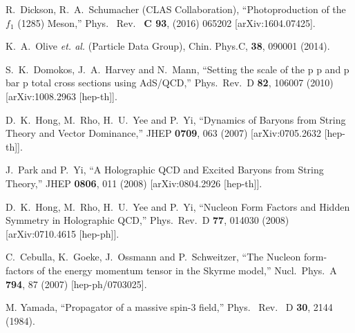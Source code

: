 \documentclass[aps, prd, preprintnumbers, floatfix, showpacs, showkeys, nofootinbib, 10pt]{revtex4-1}
\begin{document}
\begin{references}

R.~Dickson, R.~A.~Schumacher (CLAS Collaboration), 
``Photoproduction of the $f_1$ (1285) Meson,''
Phys. \ Rev. \ {\bf C 93}, (2016) 065202
[arXiv:1604.07425].

K.~A.~Olive \emph{et. al.}  (Particle Data Group), Chin. Phys.C, {\bf 38}, 090001 (2014).



  S.~K.~Domokos, J.~A.~Harvey and N.~Mann,
  ``Setting the scale of the p p and p bar p total cross sections using AdS/QCD,''
  Phys.\ Rev.\ D {\bf 82}, 106007 (2010)
  [arXiv:1008.2963 [hep-th]].

  D.~K.~Hong, M.~Rho, H.~U.~Yee and P.~Yi,
  ``Dynamics of Baryons from String Theory and Vector Dominance,''
  JHEP {\bf 0709}, 063 (2007)
  [arXiv:0705.2632 [hep-th]].

  J.~Park and P.~Yi,
  ``A Holographic QCD and Excited Baryons from String Theory,''
  JHEP {\bf 0806}, 011 (2008)
  [arXiv:0804.2926 [hep-th]].


  D.~K.~Hong, M.~Rho, H.~U.~Yee and P.~Yi,
  ``Nucleon Form Factors and Hidden Symmetry in Holographic QCD,''
  Phys.\ Rev.\  D {\bf 77}, 014030 (2008)
  [arXiv:0710.4615 [hep-ph]].

  C.~Cebulla, K.~Goeke, J.~Ossmann and P.~Schweitzer,
  ``The Nucleon form-factors of the energy momentum tensor in the Skyrme model,''
  Nucl.\ Phys.\ A {\bf 794}, 87 (2007)
  [hep-ph/0703025].


M. Yamada,
``Propagator of a massive spin-3 field,''
Phys. \ Rev. \ D {\bf 30}, 2144 (1984).


\end{references}
\end{document}
